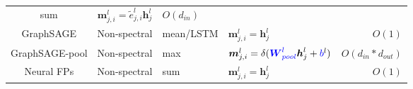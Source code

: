 \begin{table}
\begin{footnotesize}
\begin{tabular}{ccp{8em}p{22em}r}
            sum                                                                                                                       &
            $\boldsymbol{m}_{j, i}^l = \tilde{e}_{j, i}^l \boldsymbol{h}_j^l$                                                         &
            $O(d_{in})$                                                                                                                 \\
            GraphSAGE \cite{hamilton2017_graphsage}                                                                                   &
            Non-spectral                                                                                                              &
            mean/LSTM                                                                                                                 &
            $\boldsymbol{m}_{j, i}^l =  \boldsymbol{h}_j^l$                                                                           &
            $O(1)$                                                                                                                      \\
            GraphSAGE-pool \cite{hamilton2017_graphsage}                                                                              &
            Non-spectral                                                                                                              &
            max                                                                                                                       &
            $\boldsymbol{m}_{j, i}^l =  \delta(\textcolor{blue}{\boldsymbol{W}^l_{pool}} \boldsymbol{h}_j^l + \textcolor{blue}{b}^l)$ &
            $O(d_{in} * d_{out})$                                                                                                       \\
            Neural FPs  \cite{duvenaud2015_neural_fps}                                                                                &
            Non-spectral                                                                                                              &
            sum                                                                                                                       &
            $\boldsymbol{m}_{j, i}^l = \boldsymbol{h}_j^l$                                                                            &
            $O(1)$                                                                                                                      \\

\end{tabular}
\end{footnotesize}
\end{table}
